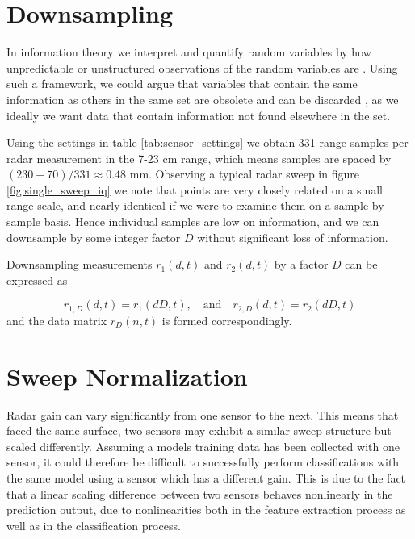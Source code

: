 \section{Downsampling}
\label{downsampling}

In information theory we interpret and quantify random variables by how unpredictable or unstructured observations of the random variables are \citep{anderson_johnnesson_2006}. Using such a framework, we could argue that variables that contain the same information as others in the same set are obsolete and can be discarded \citep{hyvasrinen_karhunen_oja_2004}, as we ideally we want data that contain information not found elsewhere in the set. 

Using the settings in table \ref{tab:sensor_settings} we obtain 331 range samples per radar measurement in the 7-23 cm range, which means samples are spaced by $(230-70)/331\approx0.48$ mm. Observing a typical radar sweep in figure \ref{fig:single_sweep_iq} we note that points are very closely related on a small range scale, and nearly identical if we were to examine them on a sample by sample basis. Hence individual samples are low on information, and we can downsample by some integer factor $D$ without significant loss of information.

Downsampling measurements $r_1(d,t)$ and $r_2(d,t)$ by a factor $D$ can be expressed as

\begin{equation}
\label{eq:downsamp}
	r_{1,D}(d, t) = r_{1}(dD,t), 
	\quad \text{and} \quad r_{2,D}(d,t) = r_{2}(dD,t)
\end{equation}
and the data matrix $r_D(n,t)$ is formed correspondingly.

\section{Sweep Normalization}

Radar gain can vary significantly from one sensor to the next. This means that faced the same surface, two sensors may exhibit a similar sweep structure but scaled differently. Assuming a models training data has been collected with one sensor, it could therefore be difficult to successfully perform classifications with the same model using a sensor which has a different gain. This is due to the fact that a linear scaling difference between two sensors behaves nonlinearly in the prediction output, due to nonlinearities both in the feature extraction process as well as in the classification process.


